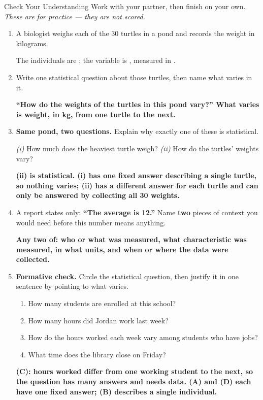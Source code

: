 \documentclass[12pt]{article}
\newcommand{\answerspace}[2]{\par\nopagebreak\noindent\begin{minipage}[t][#1][t]{\linewidth}%
  \color{keyred}\bfseries #2\end{minipage}\par}
\begin{document}
\boxguard[14]
\begin{notesbox}{Check Your Understanding}
Work with your partner, then finish on your own. \emph{These are for practice --- they are not
scored.}
\begin{enumerate}[leftmargin=1.9em, itemsep=9pt]
  \item A biologist weighs each of the 30 turtles in a pond and records the weight in kilograms.

        The individuals are ; the variable is ,
        measured in .
  \item Write one statistical question about those turtles, then name what varies in it.
        \answerspace{1.8cm}{``How do the weights of the turtles in this pond vary?''
        What varies is weight, in kg, from one turtle to the next.}
  \item \textbf{Same pond, two questions.} Explain why exactly one of these is statistical.

        \emph{(i)} How much does the heaviest turtle weigh? \quad
        \emph{(ii)} How do the turtles' weights vary?
        \answerspace{2.0cm}{(ii) is statistical. (i) has one fixed answer describing a single
        turtle, so nothing varies; (ii) has a different answer for each turtle and can only be
        answered by collecting all 30 weights.}
  \item A report states only: \textbf{``The average is 12.''} Name \textbf{two} pieces of
        context you would need before this number means anything.
        \answerspace{1.8cm}{Any two of: who or what was measured, what characteristic was
        measured, in what units, and when or where the data were collected.}
  \item \textbf{Formative check.} Circle the statistical question, then justify it in one
        sentence by pointing to what varies.
        \begin{enumerate}[label=\textbf{(\Alph*)}, leftmargin=2.2em, itemsep=4pt]
          \item How many students are enrolled at this school?
          \item How many hours did Jordan work last week?
          \item How do the hours worked each week vary among students who have jobs?
          \item What time does the library close on Friday?
        \end{enumerate}
        \answerspace{1.6cm}{(C): hours worked differ from one working student to the next, so
        the question has many answers and needs data. (A) and (D) each have one fixed answer;
        (B) describes a single individual.}
\end{enumerate}
\end{notesbox}
\end{document}
